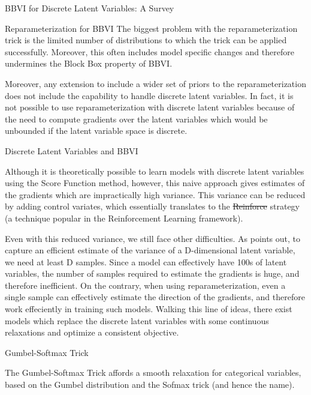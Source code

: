 \documentclass{article}
\begin{document}
\begin{psection}{BBVI for Discrete Latent Variables: A Survey}
\begin{psubsection}{Reparameterization for BBVI}
		The biggest problem with the reparameterization trick is the limited number of distributions to which the trick can be applied successfully. Moreover, this often includes model specific changes and therefore undermines the Block Box property of BBVI.

		Moreover, any extension to include a wider set of priors to the reparameterization does not include the capability to handle discrete latent variables. In fact, it is not possible to use reparameterization with discrete latent variables because of the need to compute gradients over the latent variables which would be unbounded if the latent variable space is discrete.

	\end{psubsection}

	\begin{psubsection}{Discrete Latent Variables and BBVI}

		Although it is theoretically possible to learn models with discrete latent variables using the Score Function method, however, this naive approach gives estimates of the gradients which are impractically high variance. This variance can be reduced by adding control variates, which essentially translates to the \st{Reinforce} strategy (a technique popular in the Reinforcement Learning framework).

		Even with this reduced variance, we still face other difficulties. As \cite{dvae} points out, to capture an efficient estimate of the variance of a D-dimensional latent variable, we need at least D samples. Since a model can effectively have 100s of latent variables, the number of samples required to estimate the gradients is huge, and therefore inefficient. On the contrary, when using reparameterization, even a single sample can effectively estimate the direction of the gradients, and therefore work effeciently in training such models. Walking this line of ideas, there exist models \citep{gumbel, dvae, dvae-sharp, dvae-pp, gumbolt} which replace the discrete latent variables with some continuous relaxations and optimize a consistent objective.

	\end{psubsection}

	\begin{psubsection}{Gumbel-Softmax Trick}

		The Gumbel-Softmax Trick \citep{concrete, gumbel} affords a smooth relaxation for categorical variables, based on the Gumbel distribution and the Sofmax trick (and hence the name).


\end{psubsection}
\end{psection}
\end{document}
